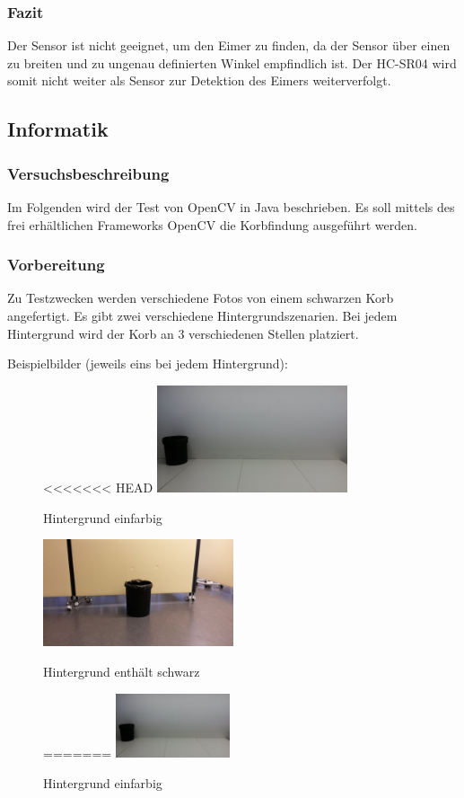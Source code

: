 \subsubsection{Fazit}
Der Sensor ist nicht geeignet, um den Eimer zu finden, da der Sensor über 
einen zu breiten und zu ungenau definierten Winkel empfindlich ist. Der 
HC-SR04 wird somit nicht weiter als Sensor zur Detektion des Eimers 
weiterverfolgt. 

\subsection{Informatik}

\subsubsection{Versuchsbeschreibung}
Im Folgenden wird der Test von OpenCV in Java beschrieben. Es soll mittels des 
frei erhältlichen Frameworks OpenCV die Korbfindung ausgeführt werden.

\subsubsection{Vorbereitung}
Zu Testzwecken werden verschiedene Fotos von einem schwarzen Korb angefertigt. 
Es gibt zwei verschiedene Hintergrundszenarien. Bei jedem Hintergrund wird der 
Korb an 3 verschiedenen Stellen platziert.

Beispielbilder (jeweils eins bei jedem Hintergrund):

\begin{figure}[h!]
<<<<<<< HEAD
	\centering
	\includegraphics[width=0.5\textwidth]{fig/korb4.jpg}
	\caption{Hintergrund einfarbig}
	\label{fig:Korb_HEinfarbig}
\end{figure}

\begin{figure}[h!]
	\centering
	\includegraphics[width=0.5\textwidth]{fig/korb1.jpg}
	\caption{Hintergrund enthält schwarz}
	\label{fig:Korb_HSchwarz}
=======
    \centering
    \includegraphics[width=0.3\textwidth]{fig/korb4.jpg}
    \caption{Hintergrund einfarbig}
    \label{fig:Korb_HEinfarbig}
\end{figure}

